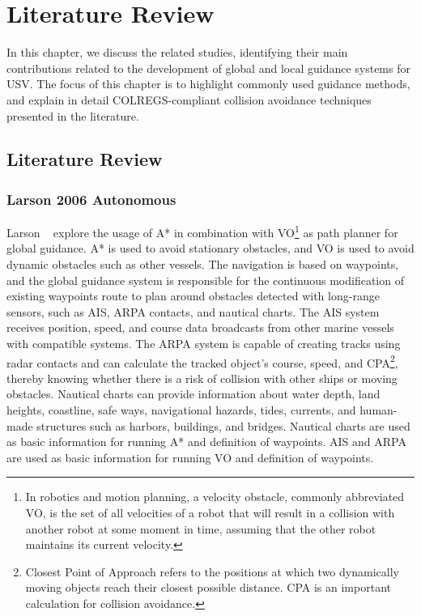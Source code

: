 \chapter{Literature Review \label{chap:3_LiteratureReview}}


    In this chapter, we discuss the related studies, identifying their main contributions related to the development of global and local guidance systems for \ac{USV}. 
    The focus of this chapter is to highlight commonly used guidance methods, and explain in detail \ac{COLREGS}-compliant collision avoidance techniques presented in the literature.
    
    \section{Literature Review}

    \subsection{Larson 2006 Autonomous}
    Larson \etal~\cite{Larson2006Autonomous} explore the usage of A* in combination with \ac{VO}\footnote{In robotics and motion planning, a velocity obstacle, commonly abbreviated VO, is the set of all velocities of a robot that will result in a collision with another robot at some moment in time, assuming that the other robot maintains its current velocity.} \cite{Fiorini1998Motion} as path planner for global guidance. A* is used to avoid stationary obstacles, and \ac{VO} is used to avoid dynamic obstacles such as other vessels. The navigation is based on waypoints, and the global guidance system is responsible for the continuous modification of existing waypoints route to plan around obstacles detected with long-range sensors, such as \ac{AIS}, \ac{ARPA} contacts, and nautical charts. The \ac{AIS} system receives position, speed, and course data broadcasts from other marine vessels with compatible systems. The \ac{ARPA} system is capable of creating tracks using radar contacts and can calculate the tracked object's course, speed, and \ac{CPA}\footnote{Closest Point of Approach refers to the positions at which two dynamically moving objects reach their closest possible distance. \ac{CPA} is an important calculation for collision avoidance.}, thereby knowing whether there is a risk of collision with other ships or moving obstacles. Nautical charts can provide information about water depth, land heights, coastline, safe ways, navigational hazards, tides, currents, and human-made structures such as harbors, buildings, and bridges. Nautical charts are used as basic information for running A* and definition of waypoints. \ac{AIS} and \ac{ARPA} are used as basic information for running \ac{VO} and definition of waypoints.
    
